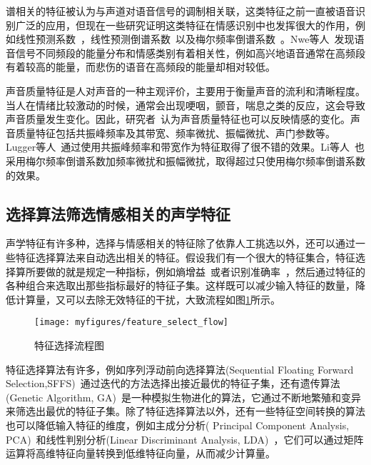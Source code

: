 谱相关的特征被认为与声道对语音信号的调制相关联，这类特征之前一直被语音识别广泛的应用，但现在一些研究证明这类特征在情感识别中也发挥很大的作用，例如线性预测系数~\cite{Ackroyd1997Digital}，线性预测倒谱系数~\cite{Atal1974Effectiveness}以及梅尔频率倒谱系数~\cite{Rabiner1999Fundamentals, Proakis1993Discrete}。Nwe等人~\cite{Nogueiras2012Speech}发现语音信号不同频段的能量分布和情感类别有着相关性，例如高兴地语音通常在高频段有着较高的能量，而悲伤的语音在高频段的能量却相对较低。

声音质量特征是人对声音的一种主观评价，主要用于衡量声音的流利和清晰程度。当人在情绪比较激动的时候，通常会出现哽咽，颤音，喘息之类的反应，这会导致声音质量发生变化。因此，研究者~\cite{Gobl2003The}认为声音质量特征也可以反映情感的变化。声音质量特征包括共振峰频率及其带宽、频率微扰、振幅微扰、声门参数等。Lugger等人~\cite{Lugger2007The, Lugger2008Psychological, Lugger2015Combining}通过使用共振峰频率和带宽作为特征取得了很不错的效果。Li等人~\cite{Li2007Stress}也采用梅尔频率倒谱系数加频率微扰和振幅微扰，取得超过只使用梅尔频率倒谱系数的效果。

\subsection{选择算法筛选情感相关的声学特征}
\label{ssec:algorithm_select}
声学特征有许多种，选择与情感相关的特征除了依靠人工挑选以外，还可以通过一些特征选择算法来自动选出相关的特征。假设我们有一个很大的特征集合，特征选择算所要做的就是规定一种指标，例如熵增益~\cite{Dhillon2003A}或者识别准确率~\cite{Dietterich1998Approximate}，然后通过特征的各种组合来选取出那些指标最好的特征子集。这样既可以减少输入特征的数量，降低计算量，又可以去除无效特征的干扰，大致流程如图\ref{fig:feature_select_flow}所示。

\begin{figure}[htb] %
    \centering
    \texttt{[image: myfigures/feature\_select\_flow]}
    \caption{特征选择流程图}
    \label{fig:feature_select_flow}
\end{figure}

特征选择算法有许多，例如序列浮动前向选择算法(Sequential Floating Forward Selection,SFFS)~\cite{Ververidis2008Fast}通过迭代的方法选择出接近最优的特征子集，还有遗传算法(Genetic Algorithm, GA)~\cite{Yang1998Feature}是一种模拟生物进化的算法，它通过不断地繁殖和变异来筛选出最优的特征子集。除了特征选择算法以外，还有一些特征空间转换的算法也可以降低输入特征的维度，例如主成分分析( Principal Component Analysis, PCA)~\cite{Ben2003Detecting}和线性判别分析(Linear Discriminant Analysis, LDA)~\cite{Blum1997Selection}，它们可以通过矩阵运算将高维特征向量转换到低维特征向量，从而减少计算量。


